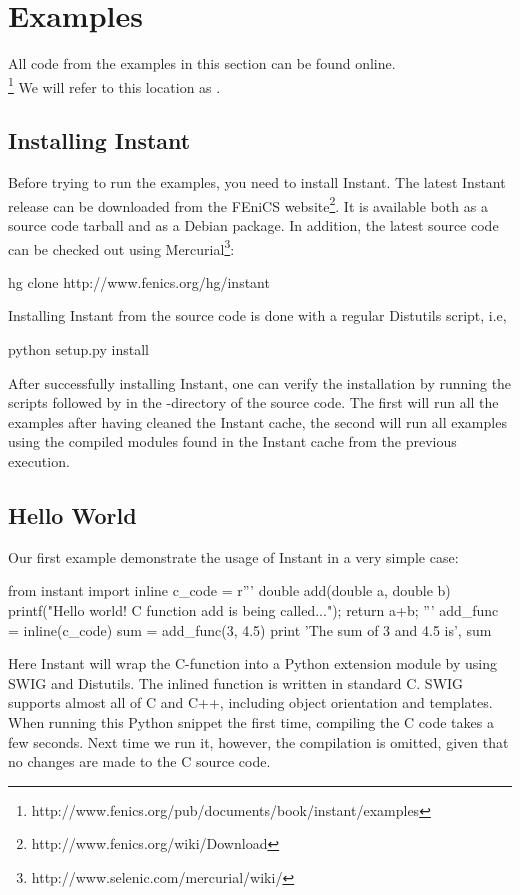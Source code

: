 \section{Examples}
\label{sec:examples}
All code from the examples in this section can be found online.\\
\footnote{http://www.fenics.org/pub/documents/book/instant/examples} We will refer
to this location as .

\subsection{Installing Instant}
Before trying to run the examples, you need to install Instant.
The latest Instant release can be downloaded from the FEniCS
website\footnote{http://www.fenics.org/wiki/Download}. It is
available both as a source code tarball and as a Debian package. In addition, the latest
source code can be checked out using
Mercurial\footnote{http://www.selenic.com/mercurial/wiki/}:
\begin{code}
hg clone http://www.fenics.org/hg/instant
\end{code}
Installing Instant
from the source code is done with a regular Distutils script, i.e,  
\begin{code}
python setup.py install
\end{code}
After successfully
installing Instant, one can verify the installation by running the scripts
 followed by  in the
-directory of the source code. The first will run all the examples after having
cleaned the Instant cache, the second will run all examples using the
compiled modules found in the Instant cache from the previous execution. 


\subsection{Hello World}
Our first example demonstrate the usage of Instant in a very simple case:
\begin{code}
from instant import inline
c_code = r'''
double add(double a, double b)
{
    printf("Hello world! C function add is being called...\n");
    return a+b;
}'''
add_func = inline(c_code)
sum = add_func(3, 4.5)
print 'The sum of 3 and 4.5 is', sum
\end{code}
Here Instant will wrap the C-function  into a Python extension module by using
SWIG and Distutils. 
The inlined function is written in standard C. SWIG supports almost
all of C and C++, including object orientation and templates. When running
this Python snippet the first time, compiling the C code takes a few seconds. Next time we run
it, however, the compilation is omitted, given that no changes are made to the
C source code. 

